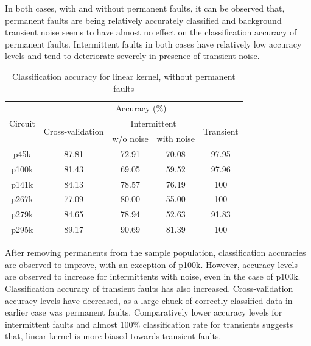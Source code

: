In both cases, with and without permanent faults, it can be observed that, permanent faults are being relatively accurately classified and background transient noise seems to have almost no effect on the classification accuracy of permanent faults. Intermittent faults in both cases have relatively low accuracy levels and tend to deteriorate severely in presence of transient noise. 


\begin{table}[h]
\captionsetup{justification=centering}
\begin{tabular}{ccccc}
\hline
\multirow{3}{*}{Circuit} & \multicolumn{4}{c}{Accuracy (\%)}\\ \cline{2-5} 
                         & \multirow{2}{*}{Cross-validation} & \multicolumn{2}{c}{Intermittent} & \multirow{2}{*}{Transient} \\ \cline{3-4}
                         &                                   & w/o noise      & with noise      &                            \\ \hline
p45k                     & 87.81                             & 72.91          & 70.08           & 97.95                      \\
p100k                    & 81.43                             & 69.05          & 59.52           & 97.96                      \\
p141k                    & 84.13                             & 78.57          & 76.19           & 100                        \\
p267k                    & 77.09                             & 80.00          & 55.00           & 100                        \\
p279k                    & 84.65                             & 78.94          & 52.63           & 91.83                      \\
p295k                    & 89.17                             & 90.69          & 81.39           & 100           \\
\hline            
\end{tabular}
\caption {Classification accuracy for linear kernel, without permanent faults}
\label{tab:linwop}
\end{table}

After removing permanents from the sample population, classification accuracies are observed to improve, with an exception of p100k. However, accuracy levels are observed to increase for intermittents with noise, even in the case of p100k. Classification accuracy of transient faults has also increased. Cross-validation accuracy levels have decreased, as a large chuck of correctly classified data in earlier case was permanent faults. Comparatively lower accuracy levels for intermittent faults and almost 100\% classification rate for transients suggests that, linear kernel is more biased towards transient faults.

